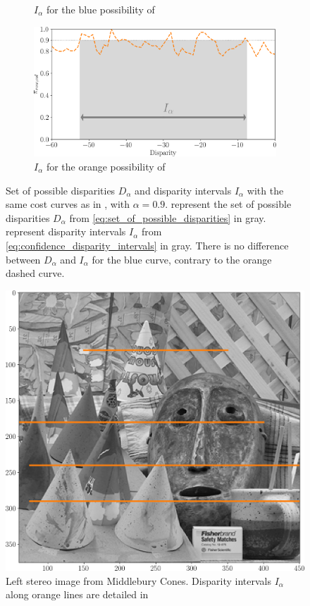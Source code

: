 \begin{figure}
\begin{subfigure}[t]{0.47\linewidth}
        \caption{$I_\alpha$ for the blue possibility of }
        \label{fig:disparity_intervals_c}
    \end{subfigure}\hfill
    \begin{subfigure}[t]{0.47\linewidth}
        \centering
        \includegraphics[width=\linewidth]{Images/Chap_5/disparity_interval_4.png}
        \caption{$I_\alpha$ for the orange possibility of }
        \label{fig:disparity_intervals_d}
    \end{subfigure}\hfill
    \caption{Set of possible disparities $D_\alpha$ and disparity intervals $I_\alpha$ with the same cost curves as in  , with $\alpha=0.9$.  represent the set of possible disparities $D_\alpha$ from \cref{eq:set_of_possible_disparities} in gray.  represent disparity intervals $I_\alpha$ from \cref{eq:confidence_disparity_intervals} in gray. There is no difference between $D_\alpha$ and $I_\alpha$ for the blue curve, contrary to the orange dashed curve.}
    \label{fig:disparity_sets_and_intervals}
\end{figure}

\begin{figure}
    \centering
    \includegraphics[width=0.5\linewidth]{Images/Chap_5/cones_with_rows.png}
    \caption{Left stereo image from Middlebury Cones. Disparity intervals $I_\alpha$ along orange lines are detailed in }
    \label{fig:cones_with_rows}
\end{figure}

